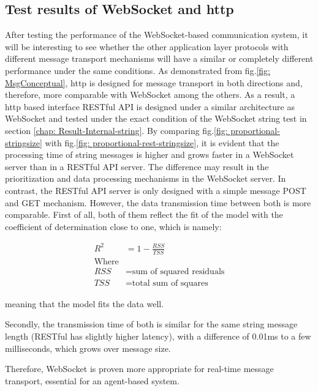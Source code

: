 \subsection{Test results of WebSocket and \gls{http}} \label{chap: Result-RestFUL_WS}
After testing the performance of the WebSocket-based communication system, it will be 
interesting to see whether the other application layer protocols with different message 
transport mechanisms will have a similar or completely different performance under the 
same conditions. As demonstrated from fig.\ref{fig: MsgConceptual}, \gls{http} is designed 
for message transport in both directions and, therefore, more comparable with WebSocket 
among the others. As a result, a \gls{http} based interface RESTful API is designed under 
a similar architecture as WebSocket and tested under the exact condition of the WebSocket 
string test in section \ref{chap: Result-Internal-string}. By comparing 
fig.\ref{fig: proportional-stringsize} with fig.\ref{fig: proportional-rest-stringsize}, 
it is evident that the processing time of string messages is higher and grows faster in 
a WebSocket server than in a RESTful API server. The difference may result in the 
prioritization and data processing mechanisms in the WebSocket server. In contrast, 
the RESTful API server is only designed with a simple message POST and GET mechanism. 
However, the data transmission time between both is more comparable. First of all, 
both of them reflect the fit of the model with the coefficient of determination close 
to one, which is namely: 


    \begin{align}
        R^{2} &= 1-\frac{RSS}{TSS}\\
        \text{Where} \nonumber\\
        RSS & = \text{sum of squared residuals} \nonumber\\
        TSS & = \text{total sum of squares}\nonumber
    \end{align}

meaning that the model fits the data well.





Secondly, the transmission time of both is similar 
for the same string message length (RESTful has slightly higher latency), with a difference 
of 0.01ms to a few milliseconds, which grows over message size. 



Therefore, WebSocket is proven more appropriate for real-time message transport, 
essential for an agent-based system.



